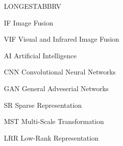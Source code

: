 \begin{theglossary}{LONGESTABBRV}

\item[IF] Image Fusion
\item[VIF] Visual and Infrared Image Fusion 
\item[AI] Artificial Intelligence
\item[CNN] Convolutional Neural Networks
\item[GAN] General Adveserial Networks   
\item[SR] Sparse Representation
\item[MST] Multi-Scale Transformation
\item[LRR] Low-Rank Representation
\end{theglossary}
